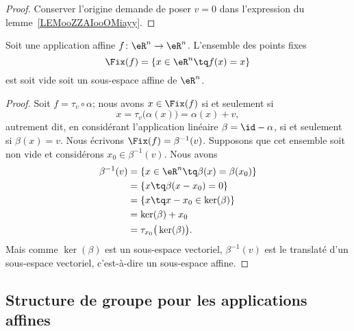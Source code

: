 \begin{proof}
	Conserver l'origine demande de poser \( v=0\) dans l'expression du lemme~\ref{LEMooZZAIooOMiayy}.
\end{proof}

\begin{proposition}     \label{PROPooYRCJooIcmUVI}
	Soit une application affine \( f\colon \eR^n\to \eR^n\). L'ensemble des points fixes
	\begin{equation}
		\Fix(f)=\{ x\in \eR^n\tq f(x)=x \}
	\end{equation}
	est soit vide soit un sous-espace affine de \( \eR^n\).
\end{proposition}

\begin{proof}
	Soit \( f=\tau_v\circ \alpha\); nous avons \( x\in\Fix(f)\) si et seulement si
	\begin{equation}
		x=\tau_v\big( \alpha(x) \big)=\alpha(x)+v,
	\end{equation}
	autrement dit, en considérant l'application linéaire \( \beta=\id-\alpha\), si et seulement si \( \beta(x)=v\). Nous écrivons \( \Fix(f)=\beta^{-1}(v)\). Supposons que cet ensemble soit non vide et considérons \( x_0\in\beta^{-1}(v)\). Nous avons
	\begin{subequations}
		\begin{align}
			\beta^{-1}(v) & =\{ x\in \eR^n\tq \beta(x)=\beta(x_0) \} \\
			              & =\{ x\tq \beta(x-x_0)=0 \}               \\
			              & =\{ x\tq x-x_0\in \ker(\beta) \}         \\
			              & =\ker(\beta)+x_0                         \\
			              & =\tau_{x_0}\big( \ker(\beta) \big).
		\end{align}
	\end{subequations}
	Mais comme \( \ker(\beta)\) est un sous-espace vectoriel, \( \beta^{-1}(v)\) est le translaté d'un sous-espace vectoriel, c'est-à-dire un sous-espace affine.
\end{proof}

\subsection{Structure de groupe pour les applications affines}

